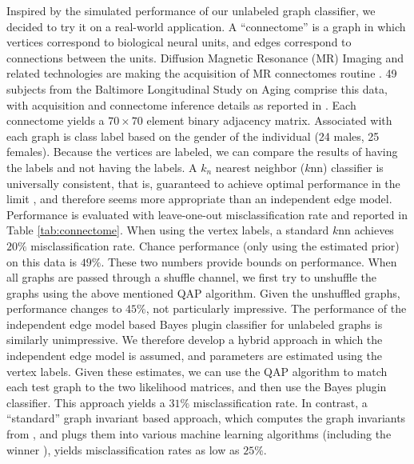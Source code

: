 \documentclass[10pt,journal,cspaper,compsoc]{IEEEtran}
\begin{document}
Inspired by the simulated performance of our unlabeled graph classifier, we decided to try it on a real-world application.  A ``connectome'' is a graph in which vertices correspond to biological neural units, and edges correspond to connections between the units.  Diffusion Magnetic Resonance (MR) Imaging and related technologies are making the acquisition of MR connectomes routine \cite{Hagmann2010}.  49 subjects from the Baltimore Longitudinal Study on Aging comprise this data, with acquisition and connectome inference details as reported in \cite{Gray11}.  Each connectome yields a $70 \times 70$ element binary adjacency matrix.  Associated with each graph is class label based on the gender of the individual (24 males, 25 females).  Because the vertices are labeled, we can compare the results of having the labels and not having the labels.  A $k_n$ nearest neighbor ($k$nn) classifier is universally consistent, that is, guaranteed to achieve optimal performance in the limit \cite{Stone1977}, and therefore seems more appropriate than an independent edge model.  Performance is evaluated with leave-one-out misclassification rate and reported in Table \ref{tab:connectome}. When using the vertex labels, a standard $k$nn achieves $20\%$ misclassification rate.  Chance performance (only using the estimated prior) on this data is $49\%$.  These two numbers provide bounds on performance.  When all graphs are passed through a shuffle channel, we first try to unshuffle the graphs using the above mentioned QAP algorithm.  Given the unshuffled graphs, performance changes to $45\%$, not particularly impressive.  The performance of the independent edge model based Bayes plugin classifier for unlabeled graphs is similarly unimpressive.  We therefore develop a hybrid approach in which the independent edge model is assumed, and parameters are estimated using the vertex labels.  Given these estimates, we can use the QAP algorithm to match each test graph to the two likelihood matrices, and then use the Bayes plugin classifier.  This approach yields a $31\%$ misclassification rate. In contrast, a ``standard'' graph invariant based approach, which computes the graph invariants from \cite{PCP10}, and plugs them into various machine learning algorithms (including the winner \cite{Crammer2008}), yields misclassification rates as low as $25\%$. 
\end{document}
